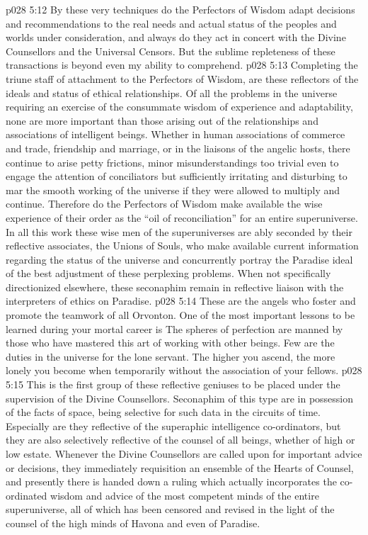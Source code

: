\vs p028 5:12 By these very techniques do the Perfectors of Wisdom adapt decisions and recommendations to the real needs and actual status of the peoples and worlds under consideration, and always do they act in concert with the Divine Counsellors and the Universal Censors. But the sublime repleteness of these transactions is beyond even my ability to comprehend.
\vs p028 5:13 \bibnobreakspace {} Completing the triune staff of attachment to the Perfectors of Wisdom, are these reflectors of the ideals and status of ethical relationships. Of all the problems in the universe requiring an exercise of the consummate wisdom of experience and adaptability, none are more important than those arising out of the relationships and associations of intelligent beings. Whether in human associations of commerce and trade, friendship and marriage, or in the liaisons of the angelic hosts, there continue to arise petty frictions, minor misunderstandings too trivial even to engage the attention of conciliators but sufficiently irritating and disturbing to mar the smooth working of the universe if they were allowed to multiply and continue. Therefore do the Perfectors of Wisdom make available the wise experience of their order as the “oil of reconciliation” for an entire superuniverse. In all this work these wise men of the superuniverses are ably seconded by their reflective associates, the Unions of Souls, who make available current information regarding the status of the universe and concurrently portray the Paradise ideal of the best adjustment of these perplexing problems. When not specifically directionized elsewhere, these seconaphim remain in reflective liaison with the interpreters of ethics on Paradise.
\vs p028 5:14 \pc These are the angels who foster and promote the teamwork of all Orvonton. One of the most important lessons to be learned during your mortal career is  The spheres of perfection are manned by those who have mastered this art of working with other beings. Few are the duties in the universe for the lone servant. The higher you ascend, the more lonely you become when temporarily without the association of your fellows.
\vs p028 5:15 \bibnobreakspace {} This is the first group of these reflective geniuses to be placed under the supervision of the Divine Counsellors. Seconaphim of this type are in possession of the facts of space, being selective for such data in the circuits of time. Especially are they reflective of the superaphic intelligence co\hyp{}ordinators, but they are also selectively reflective of the counsel of all beings, whether of high or low estate. Whenever the Divine Counsellors are called upon for important advice or decisions, they immediately requisition an ensemble of the Hearts of Counsel, and presently there is handed down a ruling which actually incorporates the co\hyp{}ordinated wisdom and advice of the most competent minds of the entire superuniverse, all of which has been censored and revised in the light of the counsel of the high minds of Havona and even of Paradise.
